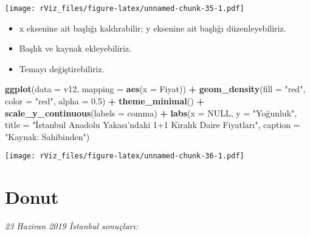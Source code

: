 \documentclass[
]{book}
\newenvironment{Shaded}{\begin{snugshade}}{\end{snugshade}}
\newcommand{\DataTypeTok}[1]{\textcolor[rgb]{0.13,0.29,0.53}{#1}}
\newcommand{\FloatTok}[1]{\textcolor[rgb]{0.00,0.00,0.81}{#1}}
\newcommand{\KeywordTok}[1]{\textcolor[rgb]{0.13,0.29,0.53}{\textbf{#1}}}
\newcommand{\NormalTok}[1]{#1}
\newcommand{\OperatorTok}[1]{\textcolor[rgb]{0.81,0.36,0.00}{\textbf{#1}}}
\newcommand{\OtherTok}[1]{\textcolor[rgb]{0.56,0.35,0.01}{#1}}
\newcommand{\StringTok}[1]{\textcolor[rgb]{0.31,0.60,0.02}{#1}}
\begin{document}
\texttt{[image: rViz\_files/figure-latex/unnamed-chunk-35-1.pdf]}

\begin{itemize}
\item
  x eksenine ait başlığı kaldırabilir; y eksenine ait başlığı düzenleyebiliriz.
\item
  Başlık ve kaynak ekleyebiliriz.
\item
  Temayı değiştirebiliriz.
\end{itemize}

\begin{Shaded}
\begin{Highlighting}[]
\KeywordTok{ggplot}\NormalTok{(}\DataTypeTok{data =}\NormalTok{ v12, }\DataTypeTok{mapping =} \KeywordTok{aes}\NormalTok{(}\DataTypeTok{x =}\NormalTok{ Fiyat)) }\OperatorTok{+}
\StringTok{  }\KeywordTok{geom_density}\NormalTok{(}\DataTypeTok{fill =} \StringTok{"red"}\NormalTok{, }\DataTypeTok{color =} \StringTok{"red"}\NormalTok{, }\DataTypeTok{alpha =} \FloatTok{0.5}\NormalTok{) }\OperatorTok{+}
\StringTok{  }\KeywordTok{theme_minimal}\NormalTok{() }\OperatorTok{+}
\StringTok{  }\KeywordTok{scale_y_continuous}\NormalTok{(}\DataTypeTok{labels =}\NormalTok{ comma) }\OperatorTok{+}
\StringTok{  }\KeywordTok{labs}\NormalTok{(}\DataTypeTok{x =} \OtherTok{NULL}\NormalTok{,}
       \DataTypeTok{y =} \StringTok{"Yoğunluk"}\NormalTok{,}
       \DataTypeTok{title =} \StringTok{"İstanbul Anadolu Yakası'ndaki 1+1 Kiralık Daire Fiyatları"}\NormalTok{,}
       \DataTypeTok{caption =} \StringTok{"Kaynak: Sahibinden"}\NormalTok{)}
\end{Highlighting}
\end{Shaded}

\texttt{[image: rViz\_files/figure-latex/unnamed-chunk-36-1.pdf]}

\hypertarget{donut}{%
\section{Donut}\label{donut}}

\emph{23 Haziran 2019 İstanbul sonuçları:}
\end{document}
